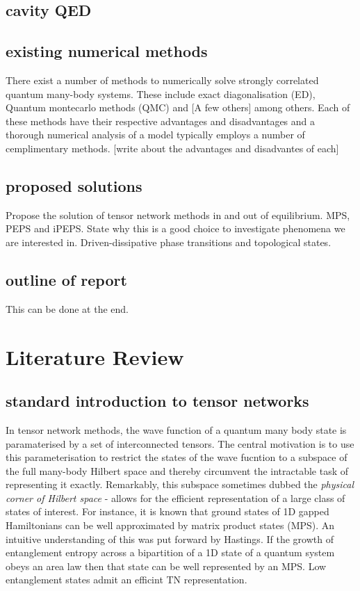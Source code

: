 \documentclass[10pt,twocolumn]{article}
\begin{document}
\subsection{cavity QED}


\subsection{existing numerical methods}
There exist a number of methods to numerically solve strongly correlated quantum many-body systems. These include exact diagonalisation (ED), Quantum montecarlo methods (QMC) and [A few others] among others. Each of these methods have their respective advantages and disadvantages and a thorough numerical analysis of a model typically employs a number of cemplimentary methods. [write about the advantages and disadvantes of each]  



\subsection{proposed solutions}
Propose the solution of tensor network methods in and out of equilibrium. MPS, PEPS and iPEPS. State why this is a good choice to investigate phenomena we are interested in. Driven-dissipative phase transitions and topological states. 
\subsection{outline of report}
This can be done at the end. 

\section{Literature Review}
\subsection{standard introduction to tensor networks}
In tensor network methods, the wave function of a quantum many body state is paramaterised by a set of interconnected tensors. The central motivation is to use this parameterisation to restrict the states of the wave fucntion to a subspace of the full many-body Hilbert space and thereby circumvent the intractable task of representing it exactly. Remarkably, this subspace sometimes dubbed the \textit{physical corner of Hilbert space} - allows for the efficient representation of a large class of states of interest. For instance, it is known that ground states of 1D gapped Hamiltonians can be well approximated by matrix product states (MPS).  An intuitive understanding of this was put forward by Hastings. If the growth of entanglement entropy across a bipartition of a 1D state of a quantum system obeys an area law then that state can be well represented by an MPS.  Low entanglement states admit an efficint TN representation. 
\end{document}
